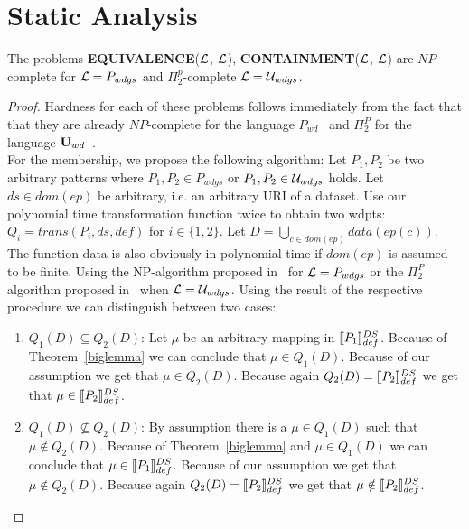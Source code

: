 \section{Static Analysis}
\begin{theorem}
	The problems \textbf{EQUIVALENCE}($\mathcal{L}$, $\mathcal{L}$), \textbf{CONTAINMENT}($\mathcal{L}$,
	$\mathcal{L}$)  are $NP$-complete for $\mathcal{L} = P_{wdgs}$ and $\Pi^p_2$-complete $\mathcal{L} = \mathcal{U}_{wdgs}$.
\end{theorem}
\begin{proof}
	Hardness for each of these problems follows immediately from the fact that
	that they are already $NP$-complete for the language $P_{wd}$~\cite{letelier2012static} 
	and $\Pi^{P}_2$ for the language $\mathbf{U}_{wd}$~\cite{pichler2014containment}.\\
	For the membership, we propose the following algorithm:
	Let $P_1,P_2$ be two arbitrary patterns where $P_1,P_2 \in P_{wdgs}$ or
	$P_1,P_2 \in \mathcal{U}_{wdgs}$ holds.
	Let $ds \in dom(ep)$ be arbitrary, i.e. an arbitrary URI of a dataset. 
	Use our polynomial time transformation function twice to obtain two
	wdpts: $Q_i = trans(P_i,ds,def)$ for $i\in \{1,2\}$. Let $D =
	\bigcup\limits_{c\in dom(ep)} data(ep(c))$. The function data is also
	obviously in polynomial time if $dom(ep)$ is assumed to be finite.
	Using the NP-algorithm proposed in~\cite{letelier2012static} for $\mathcal{L} = P_{wdgs}$ or the
	$\Pi^P_2$ algorithm proposed in~\cite{pichler2014containment} when $\mathcal{L} =
	\mathcal{U}_{wdgs}$. Using the result of the respective procedure we can distinguish
	between two cases:
	\begin{enumerate}
		\item $Q_1(D) \subseteq Q_2(D)$:
			Let $\mu$ be an arbitrary mapping in $\llbracket P_1 \rrbracket^{DS}_{def}$. Because
			of Theorem~\ref{biglemma} we can conclude that $\mu \in Q_1(D)$.
			Because of our assumption we get that $\mu \in Q_2(D)$. Because
			again $Q_2(D) = \llbracket P_2 \rrbracket^{DS}_{def}$ we get that $\mu \in \llbracket P_2
			\rrbracket^{DS}_{def}$.
		\item $Q_1(D) \not\subseteq Q_2(D)$: By assumption there is a $\mu \in
			Q_1(D)$ such that $\mu \notin Q_2(D)$. Because
			of Theorem~\ref{biglemma} and $\mu \in Q_1(D)$ we can conclude that $\mu \in \llbracket P_1
			\rrbracket^{DS}_{def}$.
			Because of our assumption we get that $\mu \notin Q_2(D)$. Because
			again $Q_2(D) = \llbracket P_2 \rrbracket^{DS}_{def}$ we get that $\mu \notin \llbracket P_2
			\rrbracket^{DS}_{def}$.
			
	\end{enumerate}
\end{proof}
